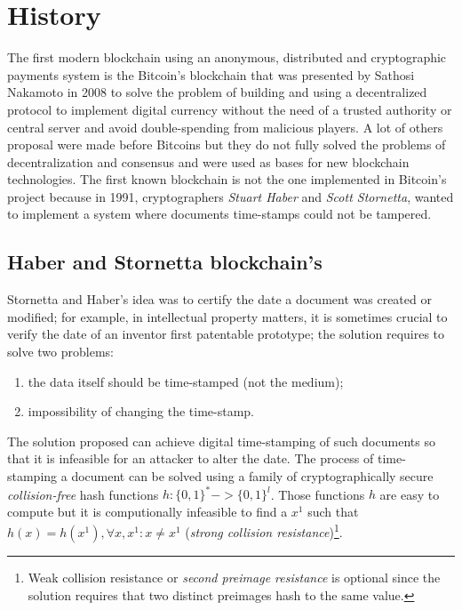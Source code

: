 \section{History}

The first modern blockchain using an anonymous, distributed and cryptographic payments system is the Bitcoin's blockchain that was presented by Sathosi Nakamoto in 2008 to solve the problem of building and using a decentralized protocol to implement digital currency without the need of a trusted authority or central server and avoid double-spending from malicious players.\newline
A lot of others proposal were made before Bitcoins but they do not fully solved the problems of decentralization and consensus and were used as bases for new blockchain technologies.\newline\newline
The first known blockchain is not the one implemented in Bitcoin's project because in 1991, cryptographers \textit{Stuart Haber} and \textit{Scott Stornetta}, wanted to implement a system where documents time-stamps could not be tampered\cite{haberstorneta}.

\subsection{Haber and Stornetta blockchain's}

Stornetta and Haber's idea was to certify the date a document was created or modified; for example, in intellectual property matters, it is sometimes crucial to verify the date of an inventor first patentable prototype; the solution requires to solve two problems:

\begin{enumerate}
    \item the data itself should be time-stamped (not the medium);
    \item impossibility of changing the time-stamp.
\end{enumerate}

The solution proposed can achieve digital time-stamping of such documents so that it is infeasible for an attacker to alter the date.\newline
The process of time-stamping a document can be solved using a family of cryptographically secure \textit{collision-free} hash functions $h: \{0,1\}^* -> \{0,1\}^l$. Those functions $h$ are easy to compute but it is computionally infeasible to find a $x^1$ such that $h(x)=h(x^1), \forall x,x^1: x \neq x^1$ (\textit{strong collision resistance})\footnote{Weak collision resistance or \textit{second preimage resistance} is optional since the solution requires that two distinct preimages hash to the same value.}.\\

